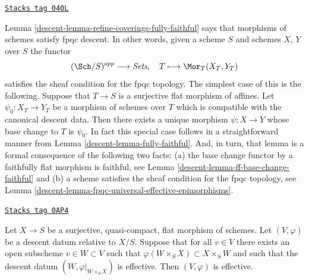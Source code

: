 \begin{remark}
\label{descent-remark-morphisms-of-schemes-satisfy-fpqc-descent}
\href{https://stacks.math.columbia.edu/tag/040L}{\texttt{Stacks tag 040L}}

Lemma \ref{descent-lemma-refine-coverings-fully-faithful}
says that morphisms of schemes satisfy fpqc descent.
In other words, given a scheme $S$ and schemes $X$, $Y$ over $S$
the functor
$$
(\Sch/S)^{opp} \longrightarrow \textit{Sets},
\quad
T \longmapsto \Mor_T(X_T, Y_T)
$$
satisfies the sheaf condition for the fpqc topology.
The simplest case of this is the following. Suppose that $T \to S$
is a surjective flat morphism of affines. Let $\psi_0 : X_T \to Y_T$
be a morphism of schemes over $T$ which is compatible with the
canonical descent data. Then there exists a unique morphism
$\psi : X \to Y$ whose base change to $T$ is $\psi_0$. In fact this
special case follows in a straightforward manner from
Lemma \ref{descent-lemma-fully-faithful}.
And, in turn, that lemma is a formal consequence of the following
two facts:
(a) the base change functor by a faithfully flat morphism is faithful, see
Lemma \ref{descent-lemma-ff-base-change-faithful}
and (b) a scheme satisfies the sheaf condition for the fpqc topology, see
Lemma \ref{descent-lemma-fpqc-universal-effective-epimorphisms}.
\end{remark}

\begin{lemma}
\label{descent-lemma-effective-for-fpqc-is-local-upstairs}
\href{https://stacks.math.columbia.edu/tag/0AP4}{\texttt{Stacks tag 0AP4}}

Let $X \to S$ be a surjective, quasi-compact, flat morphism of
schemes. Let $(V, \varphi)$ be a descent datum relative to $X/S$.
Suppose that for all $v \in V$ there exists an open subscheme
$v \in W \subset V$ such that $\varphi(W \times_S X) \subset X \times_S W$
and such that the descent datum $(W, \varphi|_{W \times_S X})$
is effective. Then $(V, \varphi)$ is effective.
\end{lemma}

